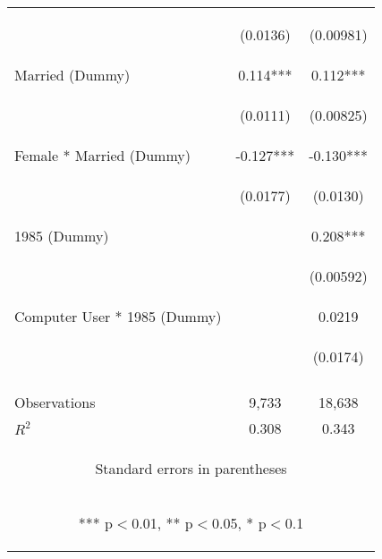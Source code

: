 \begin{center}
\begin{tabular}{lcc}
\vspace{4pt} & \begin{footnotesize}(0.0136)\end{footnotesize} & \begin{footnotesize}(0.00981)\end{footnotesize} \\
Married (Dummy) & 0.114*** & 0.112*** \\
\vspace{4pt} & \begin{footnotesize}(0.0111)\end{footnotesize} & \begin{footnotesize}(0.00825)\end{footnotesize} \\
Female * Married (Dummy) & -0.127*** & -0.130*** \\
\vspace{4pt} & \begin{footnotesize}(0.0177)\end{footnotesize} & \begin{footnotesize}(0.0130)\end{footnotesize} \\
1985 (Dummy) &  & 0.208*** \\
\vspace{4pt} & \begin{footnotesize}\end{footnotesize} & \begin{footnotesize}(0.00592)\end{footnotesize} \\
Computer User * 1985 (Dummy) &  & 0.0219 \\
 & \begin{footnotesize}\end{footnotesize} & \begin{footnotesize}(0.0174)\end{footnotesize} \\
\vspace{4pt} & \begin{footnotesize}\end{footnotesize} & \begin{footnotesize}\end{footnotesize} \\
Observations & 9,733 & 18,638 \\
 $R^2$ & 0.308 & 0.343 \\ \hline
\multicolumn{3}{c}{\begin{footnotesize} Standard errors in parentheses\end{footnotesize}} \\
\multicolumn{3}{c}{\begin{footnotesize} *** p$<$0.01, ** p$<$0.05, * p$<$0.1\end{footnotesize}} \\
\end{tabular}
\end{center}
